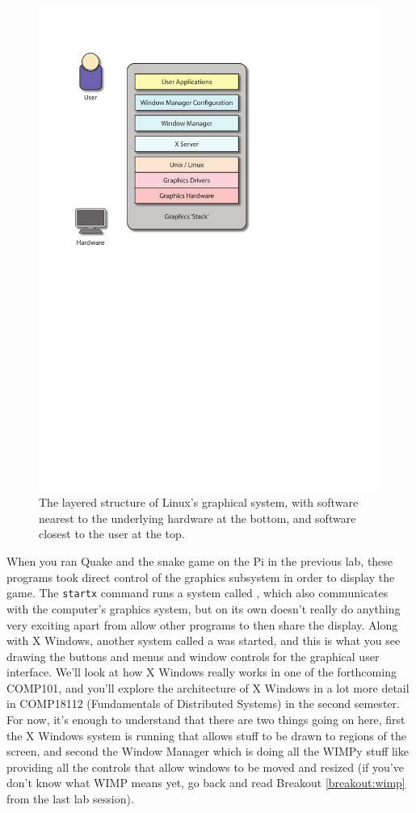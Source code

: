\begin{figure}[htb]
  \begin{center}
    \includegraphics[width=12cm]{images/graphics-stack.pdf}
  \end{center}
\caption{The layered structure of Linux's graphical system, with software nearest to the underlying hardware at the bottom, and software closest to the user at the top.}
\label{figure:Xstructure}
\end{figure}

When you ran Quake and the snake game on the Pi in the previous lab, these programs took direct control of the graphics subsystem in order to display the game. The \texttt{startx} command runs a system called , which also communicates with the computer's graphics system, but on its own doesn't really do anything very exciting apart from allow other programs to then share the display. Along with X Windows, another system called a  was started, and this is what you see drawing the buttons and menus and window controls for the graphical user interface. We'll look at how X Windows really works in one of the forthcoming COMP101, and you'll explore the architecture of X Windows in a lot more detail in COMP18112 (Fundamentals of Distributed Systems) in the second semester. For now, it's enough to understand that there are two things going on here, first the X Windows system is running that allows stuff to be drawn to regions of the screen, and second the Window Manager which is doing all the WIMPy stuff like providing all the controls that allow windows to be moved and resized (if you've don't know what WIMP means yet, go back and read Breakout \ref{breakout:wimp} from the last lab session). 

